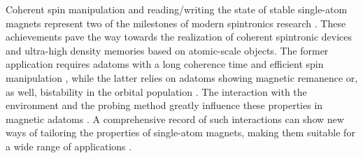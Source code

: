 \documentclass[
reprint,amsmath,amssymb,aps]{revtex4-2}
\begin{document}

Coherent spin manipulation and reading/writing the state of stable single-atom magnets represent two of the milestones of modern spintronics research \cite{Natterer2017,yang2019}. These achievements pave the way towards the realization of coherent spintronic devices and ultra-high density memories based on atomic-scale objects. The former application requires adatoms with a long coherence time and efficient spin manipulation \cite{baumannElectronParamagneticResonance2015,yang2019}, while the latter relies on adatoms showing magnetic remanence \cite{baltic2018,donatiMagneticRemanenceSingle2016,Natterer2018} or, as well, bistability in the orbital population \cite{kiralyOrbitallyDerivedSingleatom2018}. The interaction with the environment and the probing method greatly influence these properties in magnetic adatoms \cite{malavolti_MinimallyInvasiveSpin_2020,verlhacAtomicscaleSpinSensing2019a}. A comprehensive record of such interactions can show new ways of tailoring the properties of single-atom magnets, making them suitable for a wide range of applications \cite{kiraly_AtomicBoltzmannMachine_2021,khajetooriansRealizingAllSpinBased2011}.
\end{document}
